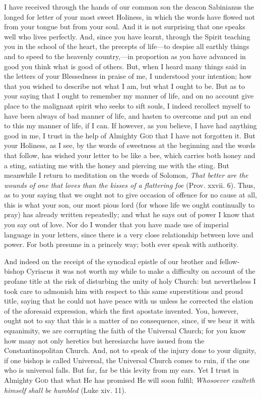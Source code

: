 I have received through the hands of our common son the deacon Sabinianus the longed for letter of your most sweet Holiness, in which the words have flowed not from your tongue but from your soul. And it is not surprising that one speaks well who lives perfectly. And, since you have learnt, through the Spirit teaching you in the school of the heart, the precepts of life—to despise all earthly things and to speed to the heavenly country,—in proportion as you have advanced in good you think what is good of others. But, when I heard many things said in the letters of your Blessedness in praise of me, I understood your intention; how that you wished to describe not what I am, but what I ought to be. But as to your saying that I ought to remember my manner of life, and on no account give place to the malignant spirit who seeks to sift souls, I indeed recollect myself to have been always of bad manner of life, and hasten to overcome and put an end to this my manner of life, if I can. If however, as you believe, I have had anything good in me, I trust in the help of Almighty \textsc{God} that I have not forgotten it. But your Holiness, as I see, by the words of sweetness at the beginning and the words that follow, has wished your letter to be like a bee, which carries both honey and a sting, satiating me with the honey and piercing me with the sting. But meanwhile I return to meditation on the words of Solomon, \emph{That better are the wounds of one that loves than the kisses of a flattering foe} (Prov. xxvii. 6). Thus, as to your saying that we ought not to give occasion of offence for no cause at all, this is what your son, our most pious lord (for whose life we ought continually to pray) has already written repeatedly; and what he says out of power I know that you say out of love. Nor do I wonder that you have made use of imperial language in your letters, since there is a very close relationship between love and power. For both presume in a princely way; both ever speak with authority.

And indeed on the receipt of the synodical epistle of our brother and fellow-bishop Cyriacus it was not worth my while to make a difficulty on account of the profane title at the risk of disturbing the unity of holy Church: but nevertheless I took care to admonish him with respect to this same superstitious and proud title, saying that he could not have peace with us unless he corrected the elation of the aforesaid expression, which the first apostate invented. You, however, ought not to say that this is a matter of no consequence, since, if we bear it with equanimity, we are corrupting the faith of the Universal Church; for you know how many not only heretics but heresiarchs have issued from the Constantinopolitan Church. And, not to speak of the injury done to your dignity, if one bishop is called Universal, the Universal Church comes to ruin, if the one who is universal falls. But far, far be this levity from my ears. Yet I trust in Almighty \textsc{God} that what He has promised He will soon fulfil; \emph{Whosoever exalteth himself shall be humbled} (Luke xiv. 11).

